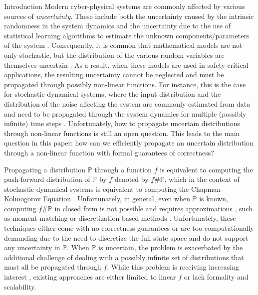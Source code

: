 \documentclass[11pt, a4paper, oneside,reqno]{amsart}
\makeatletter
\def\section{\@startsection{section}{1}%
	\z@{.7\linespacing\@plus\linespacing}{.5\linespacing}%
	{\normalfont\large\bfseries}}
\theoremstyle{plain}
\def\prob{\mathbb{P}}
\makeatother
\begin{document}
\section{Introduction}
Modern cyber-physical systems are commonly affected by various sources of \emph{uncertainty}. These include both the uncertainty caused by the intrinsic randomness in the system dynamics \cite{stengel1994optimal} and the uncertainty due to the use of statistical learning algorithms to estimate the unknown components/parameters of the system \cite{ljung2010perspectives, williams1995gaussian}. Consequently, it is common that mathematical models are not only stochastic, but the distribution of the various random variables are themselves uncertain \cite{tsiamis2019finite}. As a result, when these models are used in safety-critical applications, the resulting uncertainty cannot be neglected \cite{cheng2021limits} and must be propagated through possibly non-linear functions. For instance, this is the case for stochastic dynamical systems, where the input distribution and the distribution of the noise affecting the system are commonly estimated from data and need to be propagated through the system dynamics for multiple (possibly infinite) time steps \cite{arnold1995random}. %
Unfortunately, how to propagate uncertain distributions through non-linear functions is still an open question. This leads to the main question in this paper: how can we efficiently propagate an uncertain distribution through a non-linear function with formal guarantees of correctness?

Propagating a distribution $\prob$ through a function $f$ is equivalent to computing the push-forward distribution of $\prob$ by $f$ denoted by $f\#\prob$, which in the context of stochastic dynamical systems is equivalent to computing the Chapman-Kolmogorov Equation \cite{pavliotis2014stochastic}. Unfortunately, in general, even when $\prob$ is known, computing $f\#\prob$ in closed form is not possible and requires approximations \cite{landgraf2023probabilistic}, such as moment matching \cite{deisenroth2011pilco} or discretization-based methods \cite{julier2004unscented}. Unfortunately, these techniques either come with no correctness guarantees or are too computationally demanding due to the need to discretize the full state space and do not support any uncertainty in $\prob$. When $\prob$ is uncertain, the problem is exacerbated by the additional challenge of dealing with a possibly infinite set of distributions that must all be propagated through $f$. %
While this problem is receiving increasing interest \cite{aolaritei2022distributional, ernst2022wasserstein, adams2024finite}, existing approaches are either limited to linear $f$ or lack formality and scalability.%
\end{document}
